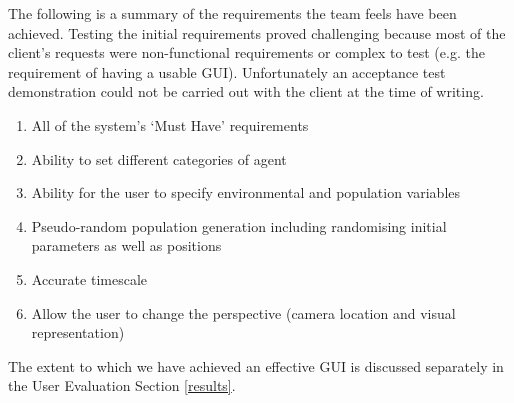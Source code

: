 The following is a summary of the requirements the team feels have been achieved. Testing the initial requirements proved challenging because most of the client's requests were non-functional requirements or complex to test (e.g. the requirement of having a usable GUI). Unfortunately an acceptance test demonstration could not be carried out with the client at the time of writing.

\begin{enumerate}
\item{All of the system's `Must Have' requirements}
\item{Ability to set different categories of agent}
\item{Ability for the user to specify environmental and population variables}
\item{Pseudo-random population generation including randomising initial parameters as well as positions}
\item{Accurate timescale}
\item{Allow the user to change the perspective (camera location and visual representation)}
\end{enumerate}

The extent to which we have achieved an effective GUI is discussed separately in the User Evaluation Section \ref{results}. 
